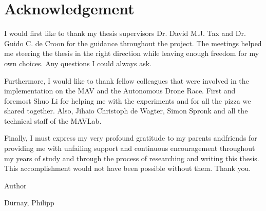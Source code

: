 \chapter{Acknowledgement}

I would first like to thank my thesis supervisors Dr. David M.J. Tax and Dr. Guido C. de Croon for the guidance throughout the project. The meetings helped me steering the thesis in the right direction while leaving enough freedom for my own choices. Any questions I could always ask.

Furthermore, I would like to thank fellow colleagues that were involved in the implementation on the \ac{MAV} and the Autonomous Drone Race. First and foremost Shuo Li for helping me with the experiments and for all the pizza we shared together. Also, Jihaio Christoph de Wagter, Simon Spronk and all the technical staff of the \ac{MAVLab}. 
 
Finally, I must express my very profound gratitude to my parents andfriends for providing me with unfailing support and continuous encouragement throughout my years of study and through the process of researching and writing this thesis. This accomplishment would not have been possible without them. Thank you.

Author

Dürnay, Philipp